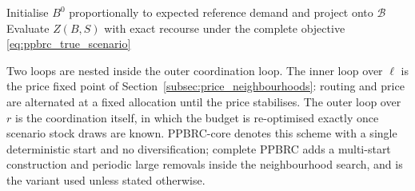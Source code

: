 \documentclass[authoryear,final,3p,times]{elsarticle}
\theoremstyle{definition}
\theoremstyle{plain}
\begin{document}
\begin{algorithm}[!htbp]
\caption{Price-Polyhedral Budget--Routing Coordination (PPBRC)}
\label{alg:ppbrc}
Initialise $B^0$ proportionally to expected reference demand and project onto $\mathcal B$\;
Evaluate $Z(B,S)$ with exact recourse under the complete objective \eqref{eq:ppbrc_true_scenario}\;
\;
\end{algorithm}

Two loops are nested inside the outer coordination loop. The inner loop over
$\ell$ is the price fixed point of Section~\ref{subsec:price_neighbourhoods}:
routing and price are alternated at a fixed allocation until the price stabilises.
The outer loop over $r$ is the coordination itself, in which the budget is
re-optimised exactly once scenario stock draws are known. PPBRC-core denotes
this scheme with a single deterministic start and no diversification;
complete PPBRC adds a multi-start construction and periodic large removals
inside the neighbourhood search, and is the variant used unless stated
otherwise.
\end{document}
